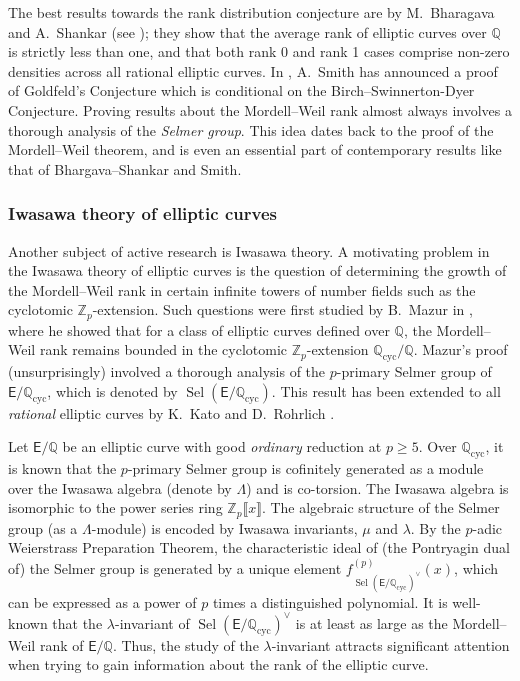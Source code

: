 \documentclass{amsart}
\numberwithin{equation}{section}
\theoremstyle{remark}
\newcommand{\cyc}{\operatorname{cyc}}
\newcommand{\Sel}{\operatorname{Sel}}
\newcommand{\Z}{\mathbb{Z}}
\newcommand{\Zp}{\mathbb{Z}_p}
\newcommand{\Q}{\mathbb{Q}}
\newcommand{\EC}{\mathsf{E}}
\theoremstyle{plain} %
\begin{document}
The best results towards the rank distribution conjecture are by M.~Bharagava and A.~Shankar (see \cite{BS15_quartic, BS15_cubic}); they show that the average rank of elliptic curves over $\Q$ is strictly less than one, and that both rank 0 and rank 1 cases comprise non-zero densities across all rational elliptic curves.
In \cite{Smi25}, A.~Smith has announced a proof of Goldfeld's Conjecture which is conditional on the Birch--Swinnerton-Dyer Conjecture.
Proving results about the Mordell--Weil rank almost always involves a thorough analysis of the \emph{Selmer group}.
This idea dates back to the proof of the Mordell--Weil theorem, and is even an essential part of contemporary results like that of Bhargava--Shankar and Smith.
  


\subsubsection*{Iwasawa theory of elliptic curves}
Another subject of active research is Iwasawa theory.
A motivating problem in the Iwasawa theory of elliptic curves is the question of determining the growth of the Mordell--Weil rank in certain infinite towers of number fields such as the cyclotomic $\Zp$-extension.
Such questions were first studied by B.~Mazur in \cite{Maz72}, where he showed that for a class of elliptic curves defined over $\Q$, the Mordell--Weil rank remains bounded in the cyclotomic $\Z_p$-extension $\Q_{\cyc}/\Q$.
Mazur's proof (unsurprisingly) involved a thorough analysis of the $p$-primary Selmer group of $\EC/\Q_{\cyc}$, which is denoted by $\Sel(\EC/\Q_{\cyc})$.
This result has been extended to all \emph{rational} elliptic curves by K.~Kato \cite{Kat04} and D.~Rohrlich \cite{Roh88}.

Let $\EC/\Q$ be an elliptic curve with good \emph{ordinary} reduction at $p\geq 5$.
Over $\Q_{\cyc}$, it is known that the $p$-primary Selmer group is cofinitely generated as a module over the Iwasawa algebra (denote by $\Lambda$) and is co-torsion.
The Iwasawa algebra is isomorphic to the power series ring $\Zp\llbracket x \rrbracket$.
The algebraic structure of the Selmer group (as a $\Lambda$-module) is encoded by Iwasawa invariants, $\mu$ and $\lambda$.
By the $p$-adic Weierstrass Preparation Theorem, the characteristic ideal of (the Pontryagin dual of) the Selmer group is generated by a unique element $f^{(p)}_{\Sel(\EC/\Q_{\cyc})^\vee} (x)$, which can be expressed as a power of $p$ times a distinguished polynomial.
It is well-known that  the $\lambda$-invariant of $\Sel(\EC/\Q_{\cyc})^\vee$ is at least as large as the Mordell--Weil rank of $\EC/\Q$.
Thus, the study of the $\lambda$-invariant attracts significant attention when trying to gain information about the rank of the elliptic curve.
\end{document}

